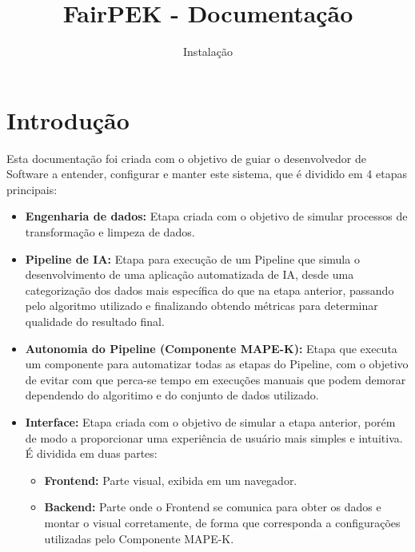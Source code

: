 \documentclass[letterpaper]{article}
\begin{document}
\title{FairPEK - Documentação}
\author{Instalação}

\maketitle

\section{Introdução}

Esta documentação foi criada com o objetivo de guiar o desenvolvedor de Software a entender, configurar e manter este sistema, que é dividido em 4 etapas principais:

\begin{itemize}
    \item {\textbf{Engenharia de dados:}} Etapa criada com o objetivo de simular processos de transformação e limpeza de dados.
    \item {\textbf{Pipeline de IA:}} Etapa para execução de um Pipeline que simula o desenvolvimento de uma aplicação automatizada de IA, desde uma categorização dos dados mais específica do que na etapa anterior, passando pelo algoritmo utilizado e finalizando obtendo métricas para determinar qualidade do resultado final.
    \item {\textbf{Autonomia do Pipeline (Componente MAPE-K):}} Etapa que executa um componente para automatizar todas as etapas do Pipeline, com o objetivo de evitar com que perca-se tempo em execuções manuais que podem demorar dependendo do algoritimo e do conjunto de dados utilizado.
    \item {\textbf{Interface:}} Etapa criada com o objetivo de simular a etapa anterior, porém de modo a proporcionar uma experiência de usuário mais simples e intuitiva. É dividida em duas partes:
    \begin{itemize}
        \item {\textbf{Frontend:}} Parte visual, exibida em um navegador.
        \item \textbf{{Backend:}} Parte onde o Frontend se comunica para obter os dados e montar o visual corretamente, de forma que corresponda a configurações utilizadas pelo Componente MAPE-K.
    \end{itemize}
\end{itemize}
\end{document}
